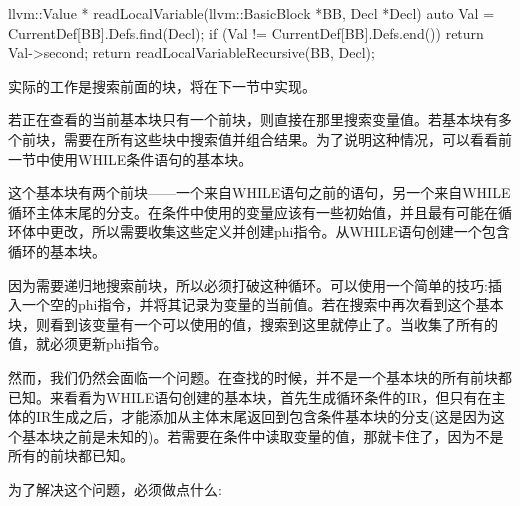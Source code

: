 \begin{cpp}
llvm::Value *
readLocalVariable(llvm::BasicBlock *BB, Decl *Decl) {
    auto Val = CurrentDef[BB].Defs.find(Decl);
    if (Val != CurrentDef[BB].Defs.end())
        return Val->second;
    return readLocalVariableRecursive(BB, Decl);
}
\end{cpp}

实际的工作是搜索前面的块，将在下一节中实现。


若正在查看的当前基本块只有一个前块，则直接在那里搜索变量值。若基本块有多个前块，需要在所有这些块中搜索值并组合结果。为了说明这种情况，可以看看前一节中使用WHILE条件语句的基本块。

这个基本块有两个前块——一个来自WHILE语句之前的语句，另一个来自WHILE循环主体末尾的分支。在条件中使用的变量应该有一些初始值，并且最有可能在循环体中更改，所以需要收集这些定义并创建phi指令。从WHILE语句创建一个包含循环的基本块。

因为需要递归地搜索前块，所以必须打破这种循环。可以使用一个简单的技巧:插入一个空的phi指令，并将其记录为变量的当前值。若在搜索中再次看到这个基本块，则看到该变量有一个可以使用的值，搜索到这里就停止了。当收集了所有的值，就必须更新phi指令。

然而，我们仍然会面临一个问题。在查找的时候，并不是一个基本块的所有前块都已知。来看看为WHILE语句创建的基本块，首先生成循环条件的IR，但只有在主体的IR生成之后，才能添加从主体末尾返回到包含条件基本块的分支(这是因为这个基本块之前是未知的)。若需要在条件中读取变量的值，那就卡住了，因为不是所有的前块都已知。

为了解决这个问题，必须做点什么:

